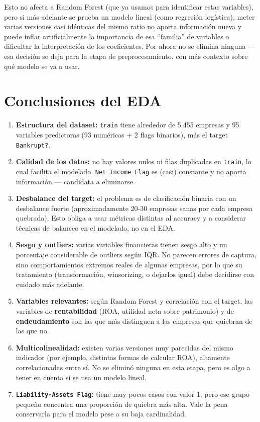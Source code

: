 \documentclass[
]{book}
\begin{document}
Esto no afecta a Random Forest (que ya usamos para identificar estas variables), pero
si más adelante se prueba un modelo lineal (como regresión logística), meter varias
versiones casi idénticas del mismo ratio no aporta información nueva y puede inflar
artificialmente la importancia de esa ``familia'' de variables o dificultar la
interpretación de los coeficientes. Por ahora no se elimina ninguna --- esa decisión se
deja para la etapa de preprocesamiento, con más contexto sobre qué modelo se va a
usar.

\chapter{Conclusiones del EDA}\label{conclusiones-del-eda}

\begin{enumerate}
\def\labelenumi{\arabic{enumi}.}
\item
  \textbf{Estructura del dataset:} \texttt{train} tiene alrededor de 5.455 empresas y 95
  variables predictoras (93 numéricas + 2 flags binarios), más el target
  \texttt{Bankrupt?}.
\item
  \textbf{Calidad de los datos:} no hay valores nulos ni filas duplicadas en \texttt{train}, lo
  cual facilita el modelado. \texttt{Net\ Income\ Flag} es (casi) constante y no aporta
  información --- candidata a eliminarse.
\item
  \textbf{Desbalance del target:} el problema es de clasificación binaria con un
  desbalance fuerte (aproximadamente 20-30 empresas sanas por cada empresa
  quebrada). Esto obliga a usar métricas distintas al accuracy y a considerar
  técnicas de balanceo en el modelado, no en el EDA.
\item
  \textbf{Sesgo y outliers:} varias variables financieras tienen sesgo alto y un
  porcentaje considerable de outliers según IQR. No parecen errores de captura, sino
  comportamientos extremos reales de algunas empresas, por lo que su tratamiento
  (transformación, winsorizing, o dejarlos igual) debe decidirse con cuidado más
  adelante.
\item
  \textbf{Variables relevantes:} según Random Forest y correlación con el target, las
  variables de \textbf{rentabilidad} (ROA, utilidad neta sobre patrimonio) y de
  \textbf{endeudamiento} son las que más distinguen a las empresas que quiebran de las
  que no.
\item
  \textbf{Multicolinealidad:} existen varias versiones muy parecidas del mismo indicador
  (por ejemplo, distintas formas de calcular ROA), altamente correlacionadas entre
  sí. No se eliminó ninguna en esta etapa, pero es algo a tener en cuenta si se usa
  un modelo lineal.
\item
  \textbf{\texttt{Liability-Assets\ Flag}:} tiene muy pocos casos con valor 1, pero ese grupo
  pequeño concentra una proporción de quiebra más alta. Vale la pena conservarla
  para el modelo pese a su baja cardinalidad.
\end{enumerate}
\end{document}
